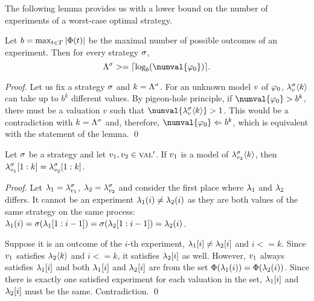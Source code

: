 The following lemma provides us with a lower bound on the number of
experiments of a worst-case optimal strategy.

\begin{lemma} \label{lma:lbound}
Let $b = \max_{t\in T} |\Phi(t)|$ be the maximal number of
  possible outcomes of an experiment. Then for every strategy $\sigma$,
  \[
  \lenmax{\stg} >= \lceil \log_b(\numval{\init}) \rceil.
  \]
\end{lemma}

\begin{proof}
Let us fix a strategy $\sigma$ and $k = \Lambda^{\sigma}$.
For an unknown model $v$ of $\varphi_0$,
  $\lambda^{\sigma}_{v}\langle k\rangle$ can take up to
  $b^k$ different values.
By pigeon-hole principle, if $\numval{\init} > b^k$, there must be a valuation
  $v$ such that $\numval{\stgknow{\stg}{\val}{k}} > 1$.
This would be a contradiction with $k = \Lambda^{\sigma}$ and, therefore,
  $\numval{\init} <= b^k$, which is equivalent with the statement of the lemma.
  \qed
\end{proof}

\begin{lemma} \label{lma:accumulatedknowledge}
Let $\sigma$ be a strategy and let $v_1, v_2 \in\textsc{val}'$.
If $v_1$ is a model of $\lambda^{\sigma}_{v_2}\langle k\rangle$,
  then $\lambda^{\sigma}_{v_1}[1:k] = \lambda^{\sigma}_{v_2}[1:k]$.
\end{lemma}

\begin{proof}
Let $\lambda_1 = \lambda^{\sigma}_{v_1}$, $\lambda_2 = \lambda^{\sigma}_{v_2}$
and consider the first place where $\lambda_1$ and $\lambda_2$ differs.
It cannot be an experiment $\lambda_1(i) \not= \lambda_2(i)$ as they are both
  values of the same strategy on the same process:
$\lambda_1(i) = \sigma(\lambda_1[1:i-1]) =
              \sigma(\lambda_2[1:i-1]) = \lambda_2(i)$.

Suppose it is an outcome of the $i$-th experiment, $\lambda_1[i] \not= \lambda_2[i]$
  and $i <= k$.
Since $v_1$ satisfies $\lambda_2\langle k\rangle$ and $i <= k$,
  it satisfies $\lambda_2[i]$ as well.
However, $v_1$ always satisfies $\lambda_1[i]$ and
  both $\lambda_1[i]$ and $\lambda_2[i]$ are from the set
  $\Phi(\lambda_1(i)) = \Phi(\lambda_2(i))$.
Since there is exactly one satisfied experiment for each valuation in the set,
  $\lambda_1[i]$ and $\lambda_2[i]$ must be the same.
Contradiction. \qed
\end{proof}

